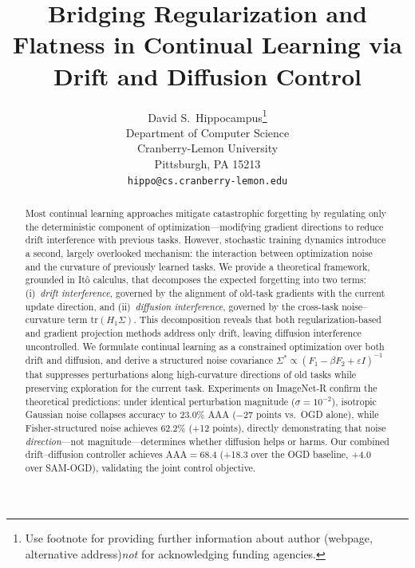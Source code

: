 \documentclass{article}
\title{Bridging Regularization and Flatness in Continual Learning via Drift and Diffusion Control}
\author{%
  David S.~Hippocampus\thanks{Use footnote for providing further information
    about author (webpage, alternative address)\emph{not} for acknowledging
    funding agencies.} \\
  Department of Computer Science\\
  Cranberry-Lemon University\\
  Pittsburgh, PA 15213 \\
  \texttt{hippo@cs.cranberry-lemon.edu} \\
}
\begin{document}
\maketitle


\begin{abstract}
Most continual learning approaches mitigate catastrophic forgetting by regulating only the deterministic component of optimization---modifying gradient directions to reduce drift interference with previous tasks. However, stochastic training dynamics introduce a second, largely overlooked mechanism: the interaction between optimization noise and the curvature of previously learned tasks. We provide a theoretical framework, grounded in It\^{o} calculus, that decomposes the expected forgetting into two terms: (i)~\emph{drift interference}, governed by the alignment of old-task gradients with the current update direction, and (ii)~\emph{diffusion interference}, governed by the cross-task noise--curvature term $\mathrm{tr}(H_1\Sigma)$. This decomposition reveals that both regularization-based and gradient projection methods address only drift, leaving diffusion interference uncontrolled. We formulate continual learning as a constrained optimization over both drift and diffusion, and derive a structured noise covariance $\Sigma^* \propto (F_1 - \beta F_2 + \varepsilon I)^{-1}$ that suppresses perturbations along high-curvature directions of old tasks while preserving exploration for the current task. Experiments on ImageNet-R confirm the theoretical predictions: under identical perturbation magnitude ($\sigma=10^{-2}$), isotropic Gaussian noise collapses accuracy to 23.0\% AAA ($-27$ points vs.\ OGD alone), while Fisher-structured noise achieves 62.2\% (+12 points), directly demonstrating that noise \emph{direction}---not magnitude---determines whether diffusion helps or harms. Our combined drift--diffusion controller achieves AAA$=68.4$ (+18.3 over the OGD baseline, +4.0 over SAM-OGD), validating the joint control objective.
\end{abstract}



\end{document}
